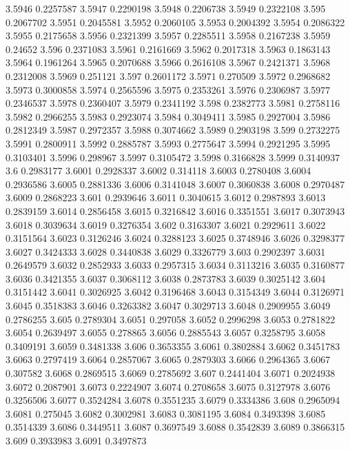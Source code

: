 3.5946  0.2257587
3.5947  0.2290198
3.5948  0.2206738
3.5949  0.2322108
3.595  0.2067702
3.5951  0.2045581
3.5952  0.2060105
3.5953  0.2004392
3.5954  0.2086322
3.5955  0.2175658
3.5956  0.2321399
3.5957  0.2285511
3.5958  0.2167238
3.5959  0.24652
3.596  0.2371083
3.5961  0.2161669
3.5962  0.2017318
3.5963  0.1863143
3.5964  0.1961264
3.5965  0.2070688
3.5966  0.2616108
3.5967  0.2421371
3.5968  0.2312008
3.5969  0.251121
3.597  0.2601172
3.5971  0.270509
3.5972  0.2968682
3.5973  0.3000858
3.5974  0.2565596
3.5975  0.2353261
3.5976  0.2306987
3.5977  0.2346537
3.5978  0.2360407
3.5979  0.2341192
3.598  0.2382773
3.5981  0.2758116
3.5982  0.2966255
3.5983  0.2923074
3.5984  0.3049411
3.5985  0.2927004
3.5986  0.2812349
3.5987  0.2972357
3.5988  0.3074662
3.5989  0.2903198
3.599  0.2732275
3.5991  0.2800911
3.5992  0.2885787
3.5993  0.2775647
3.5994  0.2921295
3.5995  0.3103401
3.5996  0.298967
3.5997  0.3105472
3.5998  0.3166828
3.5999  0.3140937
3.6  0.2983177
3.6001  0.2928337
3.6002  0.314118
3.6003  0.2780408
3.6004  0.2936586
3.6005  0.2881336
3.6006  0.3141048
3.6007  0.3060838
3.6008  0.2970487
3.6009  0.2868223
3.601  0.2939646
3.6011  0.3040615
3.6012  0.2987893
3.6013  0.2839159
3.6014  0.2856458
3.6015  0.3216842
3.6016  0.3351551
3.6017  0.3073943
3.6018  0.3039634
3.6019  0.3276354
3.602  0.3163307
3.6021  0.2929611
3.6022  0.3151564
3.6023  0.3126246
3.6024  0.3288123
3.6025  0.3748946
3.6026  0.3298377
3.6027  0.3424333
3.6028  0.3440838
3.6029  0.3326779
3.603  0.2902397
3.6031  0.2649579
3.6032  0.2852933
3.6033  0.2957315
3.6034  0.3113216
3.6035  0.3160877
3.6036  0.3421355
3.6037  0.3068112
3.6038  0.2873783
3.6039  0.3025142
3.604  0.3151442
3.6041  0.3026925
3.6042  0.3196468
3.6043  0.3154349
3.6044  0.3126971
3.6045  0.3518383
3.6046  0.3263382
3.6047  0.3029713
3.6048  0.2909955
3.6049  0.2786255
3.605  0.2789304
3.6051  0.297058
3.6052  0.2996298
3.6053  0.2781822
3.6054  0.2639497
3.6055  0.278865
3.6056  0.2885543
3.6057  0.3258795
3.6058  0.3409191
3.6059  0.3481338
3.606  0.3653355
3.6061  0.3802884
3.6062  0.3451783
3.6063  0.2797419
3.6064  0.2857067
3.6065  0.2879303
3.6066  0.2964365
3.6067  0.307582
3.6068  0.2869515
3.6069  0.2785692
3.607  0.2441404
3.6071  0.2024938
3.6072  0.2087901
3.6073  0.2224907
3.6074  0.2708658
3.6075  0.3127978
3.6076  0.3256506
3.6077  0.3524284
3.6078  0.3551235
3.6079  0.3334386
3.608  0.2965094
3.6081  0.275045
3.6082  0.3002981
3.6083  0.3081195
3.6084  0.3493398
3.6085  0.3514339
3.6086  0.3449511
3.6087  0.3697549
3.6088  0.3542839
3.6089  0.3866315
3.609  0.3933983
3.6091  0.3497873

